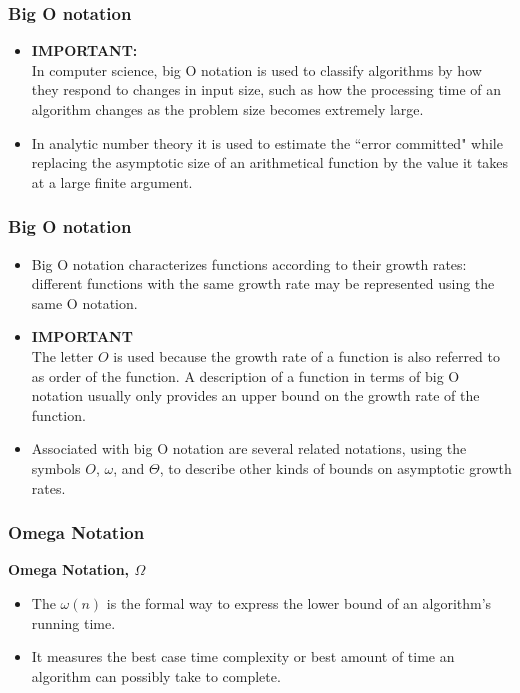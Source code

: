 \documentclass{beamer}
\begin{document}
\begin{frame}
	\frametitle{Big O notation}
	\large
	\begin{itemize}
		\item \textbf{IMPORTANT:} \\In computer science, big O notation is used to classify algorithms by how they respond to changes in input size, such as how the processing time of an algorithm changes as the problem size becomes extremely large. \smallskip
		\item In analytic number theory it is used to estimate the ``error committed" while replacing the asymptotic size of an arithmetical function by the value it takes at a large finite argument. 
	\end{itemize}
\end{frame}
\begin{frame}
	\frametitle{Big O notation}
	\large
	\begin{itemize}
		\item Big O notation characterizes functions according to their growth rates: different functions with the same growth rate may be represented using the same O notation.
		\item \textbf{IMPORTANT}\\
		The letter $O$ is used because the growth rate of a function is also referred to as order of the function. A description of a function in terms of big O notation usually only provides an upper bound on the growth rate of the function.
		\item Associated with big O notation are several related notations, using the symbols $O$, $\omega$, and $\Theta$, to describe other kinds of bounds on asymptotic growth rates.
	\end{itemize}
\end{frame}
\begin{frame}
	\frametitle{Omega Notation}
	\large
	\vspace{-1cm}
	\noindent \textbf{Omega Notation, $\Omega$}
	\begin{itemize}
		\item The $\omega (n)$ is the formal way to express the lower bound of an algorithm's running time. 
		\item It measures the best case time complexity or best amount of time an algorithm can possibly take to complete.
	\end{itemize}
\end{frame}
\end{document}
